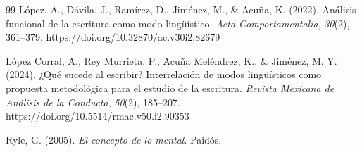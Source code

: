 \documentclass[12pt]{article}
\begin{document}
\begin{thebibliography}{99}
López, A., Dávila, J., Ramírez, D., Jiménez, M., \& Acuña, K. (2022). Análisis funcional de
la escritura como modo lingüístico. \emph{Acta Comportamentalia}, \emph{30}(2), 361--379.
https://doi.org/10.32870/ac.v30i2.82679

López Corral, A., Rey Murrieta, P., Acuña Meléndrez, K., \& Jiménez, M. Y. (2024). ¿Qué
sucede al escribir? Interrelación de modos lingüísticos como propuesta metodológica para el
estudio de la escritura. \emph{Revista Mexicana de Análisis de la Conducta}, \emph{50}(2),
185--207. https://doi.org/10.5514/rmac.v50.i2.90353

Ryle, G. (2005). \emph{El concepto de lo mental}. Paidós.

\end{thebibliography}
\end{document}
